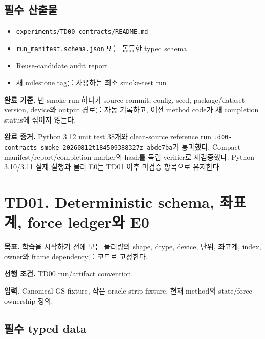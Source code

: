 \documentclass[10pt,a4paper]{article}
\newcommand{\code}[1]{\texttt{#1}}
\newcommand{\artifact}[1]{\textcolor{ProgressBlue}{\nolinkurl{#1}}}
\begin{document}
\subsection*{필수 산출물}

\begin{itemize}
  \item \artifact{experiments/TD00_contracts/README.md}
  \item \artifact{run_manifest.schema.json} 또는 동등한 typed schema
  \item Reuse-candidate audit report
  \item 새 milestone tag를 사용하는 최소 smoke-test run
\end{itemize}

\textbf{완료 기준.}
빈 smoke run 하나가 source commit, config, seed, package/dataset version, device와 output 경로를 자동 기록하고,
이전 method code가 새 completion status에 섞이지 않는다.

\textbf{완료 증거.}
Python 3.12 unit test 38개와 clean-source reference run
\code{td00-contracts-smoke-20260812t184509388327z-abde7ba}가 통과했다.
Compact manifest/report/completion marker의 hash를 독립 verifier로 재검증했다.
Python 3.10/3.11 실제 실행과 물리 E0는 TD01 이후 미검증 항목으로 유지한다.

\section{TD01. Deterministic schema, 좌표계, force ledger와 E0}

\textbf{목표.}
학습을 시작하기 전에 모든 물리량의 shape, dtype, device, 단위, 좌표계, index, owner와 frame dependency를 코드로 고정한다.

\textbf{선행 조건.} TD00 run/artifact convention.

\textbf{입력.}
Canonical GS fixture, 작은 oracle strip fixture, 현재 method의 state/force ownership 정의.

\subsection*{필수 typed data}
\end{document}
